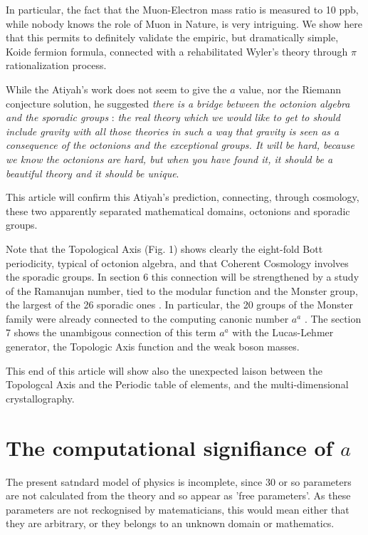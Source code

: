 \documentclass[a4paper,9pt]{article}
\begin{document}
      
   In particular, the fact that the Muon-Electron mass ratio is measured to 10 ppb, while nobody knows the role of Muon in Nature, is very intriguing. We show here that this permits to definitely validate the empiric, but dramatically simple, Koide fermion formula, connected with a rehabilitated Wyler's theory through $\pi$ rationalization process. 
   
   
   While the Atiyah's work does not seem to give the $a$ value, nor the Riemann conjecture solution, he suggested \cite{Atiyah1} \textit{there is a bridge between the octonion algebra and the sporadic groups} : \textit {the real theory which we would like to get to should include gravity with all those theories in such a way that gravity is seen as a consequence of the octonions and the exceptional groups. It will be hard, because we know the octonions are hard, but when you have found it, it should be a beautiful theory and it should be unique}. 
   
   
   
   This article will confirm this Atiyah's prediction, connecting, through cosmology, these two apparently separated mathematical domains, octonions and sporadic groups.
   
   
   
   Note that the Topological Axis (Fig. 1) shows clearly the eight-fold Bott periodicity, typical of octonion algebra, and that Coherent Cosmology involves the sporadic groups. In section 6 this connection will be strengthened by a study of the Ramanujan number, tied to the modular function and the Monster group, the largest of the 26 sporadic ones \cite{Conway} \cite{Borcherds}. In particular, the 20 groups of the Monster family were already connected to the computing canonic number $a^a$ \cite{Sanchez}. The section 7 shows the unambigous connection of this term $a^a$ with the Lucas-Lehmer generator, the Topologic Axis function and the weak boson masses.  
   
   
   This end of this article will show also the unexpected laison between the Topologcal Axis and the Periodic table of elements, and the multi-dimensional crystallography.
   
   \section{The computational signifiance of $a$}
   
         The present satndard model of physics is incomplete, since 30 or so parameters are not calculated from the theory and so appear as 'free parameters'. As these parameters are not reckognised by matematicians, this would mean either that they are arbitrary, or they belongs to an unknown domain or mathematics. 
         
\end{document}
